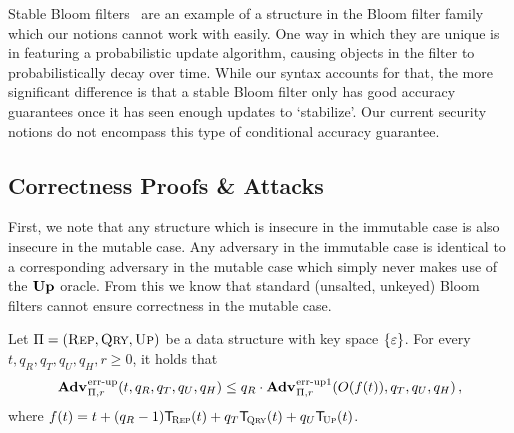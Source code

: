 Stable Bloom filters~\cite{xxx} are an example of a structure in the Bloom filter family which our notions cannot work with easily. One way in which they are unique is in featuring a probabilistic update algorithm, causing objects in the filter to probabilistically decay over time. While our syntax accounts for that, the more significant difference is that a stable Bloom filter only has good accuracy guarantees once it has seen enough updates to `stabilize'. Our current security notions do not encompass this type of conditional accuracy guarantee.

\subsection{Correctness Proofs \& Attacks}

First, we note that any structure which is insecure in the immutable case is also insecure in the mutable case. Any adversary in the immutable case is identical to a corresponding adversary in the mutable case which simply never makes use of the $\mathbf{Up}\hspace{0.5pt}$ oracle. From this we know that standard (unsalted, unkeyed) Bloom filters cannot ensure correctness in the mutable case.

\begin{lemma}\label{lemma:errep}
  Let $\mathrm{\Pi} = (\textsc{Rep}, \textsc{Qry}, \textsc{Up})$ be a data structure with key
  space $\{\varepsilon\}$. For every $t, q_R, q_T, q_U, q_H, r\geq 0$, it holds that
  \[
    \Adv{\errep}_{\struct,r}(t, q_R, q_T, q_U, q_H) \leq
    q_R\cdot\Adv{\errep1}_{\struct,r}(O(f(t)), q_T, q_U, q_H) \,,
  \]
  where $f(t) = t + (q_R-1)\ticks(\Rep,t) + q_T\ticks(\Qry,t) + q_U\ticks(\Up,t)$.
\end{lemma}


